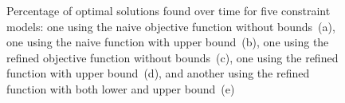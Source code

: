 \begin{figure}
  \def\modelFont#1{{\small\figureFont#1}}
  \def\modelA{\modelFont{a}}
  \def\modelB{\modelFont{b}}
  \def\modelC{\modelFont{c}}
  \def\modelD{\modelFont{d}}
  \def\modelE{\modelFont{e}}

  \renewcommand{\plotPercentageFont}{\large}
  \renewcommand{\plotSecondsFont}{\large}
  \centering%

  \caption[%
            Plot for evaluating the different objective functions' impact on
            finding optimal solutions%
          ]%
          {%
            Percentage of optimal solutions found over time for five constraint
            models: one using the naive objective function without
            bounds~(\modelA), one using the naive function with upper
            bound~(\modelB), one using the refined objective function without
            bounds~(\modelC), one using the refined function with upper
            bound~(\modelD), and another using the refined function with both
            lower and upper bound~(\modelE)%
          }
\end{figure}




